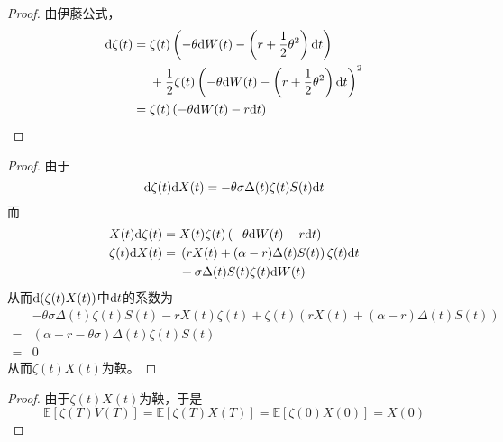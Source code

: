 \documentclass[cn]{homework}
\newcommand{\E}{{\mathbb E}}
\begin{document}
    \problem[习题4.18]
    \begin{subproblem}
        \item
        \begin{proof}
            由伊藤公式，
            \[\begin{aligned}
                \mathrm d\zeta(t)&=
                \begin{aligned}[t]
                &\zeta(t)\left(-\theta\mathrm d W(t)
                -\left(r+\frac{1}{2}\theta^2\right)\mathrm d t\right)\\
                &+\frac{1}{2}\zeta(t)
                \left(-\theta\mathrm d W(t)
                -\left(r+\frac{1}{2}\theta^2\right)\mathrm d t\right)^2
                \end{aligned}\\
                &=\zeta(t)\left(-\theta\mathrm d W(t)-r\mathrm d t\right)
            \end{aligned}\]
        \end{proof}

        \item
        \begin{proof}
            由于
            \[\mathrm d\zeta(t)\mathrm d X(t)=-\theta\sigma\Delta(t)\zeta(t)S(t)\mathrm d t\]
            而
            \[\begin{aligned}
                X(t)\mathrm d\zeta(t)&=X(t)\zeta(t)\left(-\theta\mathrm d W(t)-r\mathrm d t\right)\\
                \zeta(t)\mathrm d X(t)&=\begin{aligned}[t]
                    &\left(rX(t)+(\alpha-r)\Delta(t)S(t)\right)\zeta(t)\mathrm d t\\
                    &+\sigma\Delta(t)S(t)\zeta(t)\mathrm d W(t)
                \end{aligned}
            \end{aligned}\]
            从而$\mathrm d(\zeta(t)X(t))$中$\mathrm d t$的系数为
            \[\begin{aligned}
                &-\theta\sigma\Delta(t)\zeta(t)S(t)-rX(t)\zeta(t)+\zeta(t)(rX(t)+(\alpha-r)\Delta(t)S(t))\\
                =&(\alpha-r-\theta\sigma)\Delta(t)\zeta(t)S(t)\\
                =&0
            \end{aligned}\]
            从而$\zeta(t)X(t)$为鞅。
        \end{proof}

        \item
        \begin{proof}
            由于$\zeta(t)X(t)$为鞅，于是
            \[\E[\zeta(T)V(T)]=\E[\zeta(T)X(T)]=\E[\zeta(0)X(0)]=X(0)\]
        \end{proof}
    \end{subproblem}
\end{document}
